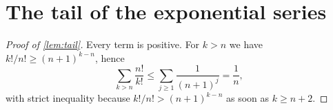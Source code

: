 \section{The tail of the exponential series}\label{app:series}

\begin{proof}[Proof of \cref{lem:tail}]
Every term is positive. For $k>n$ we have $k!/n!\ge(n+1)^{k-n}$, hence
\[
  \sum_{k>n}\frac{n!}{k!}\le\sum_{j\ge1}\frac{1}{(n+1)^{j}}=\frac1n ,
\]
with strict inequality because $k!/n!>(n+1)^{k-n}$ as soon as $k\ge n+2$.
\end{proof}
